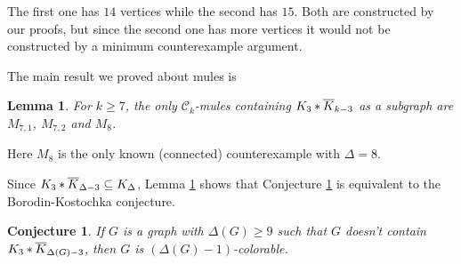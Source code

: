 \documentclass[12pt]{article}
\theoremstyle{plain}
\newtheorem{lem}[thm]{Lemma}
\newtheorem{conjecture}[thm]{Conjecture}
\theoremstyle{definition}
\theoremstyle{remark}
\newcommand{\fancy}[1]{\mathcal{#1}}
\newcommand{\join}[2]{#1 \mbox{\hspace{2 pt}$\ast$\hspace{2 pt}} #2}
\begin{document}
The first one has $14$ vertices while the second has $15$. Both are constructed by our proofs, but since the second one has more vertices it would not be constructed by a minimum counterexample argument.

\bigskip

The main result we proved about mules is

\begin{lem}\label{K3sOut}
For $k \geq 7$, the only $\fancy{C}_k$-mules containing $\join{K_3}{\overline{K}_{k-3}}$
as a subgraph are $M_{7,1}$,  $M_{7,2}$ and $M_8$.
\end{lem}

Here $M_8$ is the only known (connected) counterexample with $\Delta=8$.



Since $\join{K_3}{\overline{K}_{\Delta-3}} \subseteq K_\Delta$, Lemma \ref{K3sOut} shows
that Conjecture \ref{K3Conjecture} is equivalent to the Borodin-Kostochka
conjecture.

\begin{conjecture}\label{K3Conjecture}
If $G$ is a graph with $\Delta(G) \geq 9$ such that $G$ doesn't contain $\join{K_3}{\overline{K}_{\Delta(G)-3}}$, then $G$ is $(\Delta(G)-1)$-colorable.
\end{conjecture}
\end{document}
